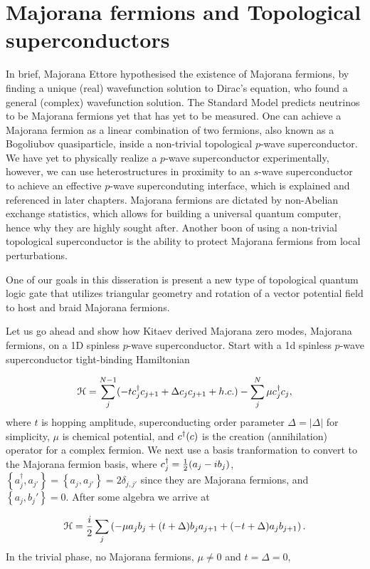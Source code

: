 \section{Majorana fermions and Topological superconductors}

In brief, Majorana Ettore hypothesised the existence of Majorana fermions, by finding a unique (real) wavefunction solution to Dirac's equation, who found a general (complex) wavefunction solution.
The Standard Model predicts neutrinos to be Majorana fermions yet that has yet to be measured.
One can achieve a Majorana fermion as a linear combination of two fermions, also known as a Bogoliubov quasiparticle, inside a non-trivial topological $p$-wave superconductor.
We have yet to physically realize a $p$-wave superconductor experimentally, however, we can use heterostructures in proximity to an $s$-wave superconductor to achieve an effective $p$-wave superconduting interface, which is explained and referenced in later chapters.
Majorana fermions are dictated by non-Abelian exchange statistics, which allows for building a universal quantum computer, hence why they are highly sought after.
Another boon of using a non-trivial topological superconductor is the ability to protect Majorana fermions from local perturbations.

One of our goals in this disseration is present a new type of topological quantum logic gate that utilizes triangular geometry and rotation of a vector potential field to host and braid Majorana fermions.

Let us go ahead and show how Kitaev derived Majorana zero modes, Majorana fermions, on a 1D spinless $p$-wave superconductor.
Start with a 1d spinless $p$-wave superconductor tight-binding Hamiltonian

\begin{equation}
  \mathcal{H} = \sum_j^{N-1} (-t c^{\dagger}_j c_{j+1} + \Delta c_j c_{j+1} + h.c.) - \sum_j^{N} \mu c^{\dagger}_j c_j,
\end{equation}
where $t$ is hopping amplitude, superconducting order parameter $\Delta = |\Delta|$ for simplicity, $\mu$ is chemical potential, and $c^{\dagger} (c)$ is the creation (annihilation) operator for a complex fermion.
We next use a basis tranformation to convert to the Majorana fermion basis, where $c^{\dagger}_j = \tfrac{1}{2} (a_j - i b_j)$, $\left\{ a^{\dagger}_j, a_{j'} \right\} = \left\{ a_j, a_{j'} \right\} = 2\delta_{j,j'}$ since they are Majorana fermions, and $\left\{a_j,b_j'\right\} = 0$.
After some algebra we arrive at

\begin{equation}
  \mathcal{H} = \dfrac{i}{2} \sum_j \left( -\mu a_j b_j + (t+\Delta) b_j a_{j+1} + (-t+\Delta) a_j b_{j+1} \right).
\end{equation}
In the trivial phase, no Majorana fermions, $\mu \neq 0$ and $t=\Delta=0$,

